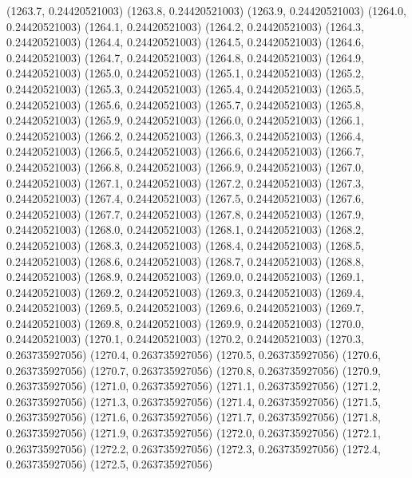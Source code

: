 {					(1263.7, 0.24420521003)
					(1263.8, 0.24420521003)
					(1263.9, 0.24420521003)
					(1264.0, 0.24420521003)
					(1264.1, 0.24420521003)
					(1264.2, 0.24420521003)
					(1264.3, 0.24420521003)
					(1264.4, 0.24420521003)
					(1264.5, 0.24420521003)
					(1264.6, 0.24420521003)
					(1264.7, 0.24420521003)
					(1264.8, 0.24420521003)
					(1264.9, 0.24420521003)
					(1265.0, 0.24420521003)
					(1265.1, 0.24420521003)
					(1265.2, 0.24420521003)
					(1265.3, 0.24420521003)
					(1265.4, 0.24420521003)
					(1265.5, 0.24420521003)
					(1265.6, 0.24420521003)
					(1265.7, 0.24420521003)
					(1265.8, 0.24420521003)
					(1265.9, 0.24420521003)
					(1266.0, 0.24420521003)
					(1266.1, 0.24420521003)
					(1266.2, 0.24420521003)
					(1266.3, 0.24420521003)
					(1266.4, 0.24420521003)
					(1266.5, 0.24420521003)
					(1266.6, 0.24420521003)
					(1266.7, 0.24420521003)
					(1266.8, 0.24420521003)
					(1266.9, 0.24420521003)
					(1267.0, 0.24420521003)
					(1267.1, 0.24420521003)
					(1267.2, 0.24420521003)
					(1267.3, 0.24420521003)
					(1267.4, 0.24420521003)
					(1267.5, 0.24420521003)
					(1267.6, 0.24420521003)
					(1267.7, 0.24420521003)
					(1267.8, 0.24420521003)
					(1267.9, 0.24420521003)
					(1268.0, 0.24420521003)
					(1268.1, 0.24420521003)
					(1268.2, 0.24420521003)
					(1268.3, 0.24420521003)
					(1268.4, 0.24420521003)
					(1268.5, 0.24420521003)
					(1268.6, 0.24420521003)
					(1268.7, 0.24420521003)
					(1268.8, 0.24420521003)
					(1268.9, 0.24420521003)
					(1269.0, 0.24420521003)
					(1269.1, 0.24420521003)
					(1269.2, 0.24420521003)
					(1269.3, 0.24420521003)
					(1269.4, 0.24420521003)
					(1269.5, 0.24420521003)
					(1269.6, 0.24420521003)
					(1269.7, 0.24420521003)
					(1269.8, 0.24420521003)
					(1269.9, 0.24420521003)
					(1270.0, 0.24420521003)
					(1270.1, 0.24420521003)
					(1270.2, 0.24420521003)
					(1270.3, 0.263735927056)
					(1270.4, 0.263735927056)
					(1270.5, 0.263735927056)
					(1270.6, 0.263735927056)
					(1270.7, 0.263735927056)
					(1270.8, 0.263735927056)
					(1270.9, 0.263735927056)
					(1271.0, 0.263735927056)
					(1271.1, 0.263735927056)
					(1271.2, 0.263735927056)
					(1271.3, 0.263735927056)
					(1271.4, 0.263735927056)
					(1271.5, 0.263735927056)
					(1271.6, 0.263735927056)
					(1271.7, 0.263735927056)
					(1271.8, 0.263735927056)
					(1271.9, 0.263735927056)
					(1272.0, 0.263735927056)
					(1272.1, 0.263735927056)
					(1272.2, 0.263735927056)
					(1272.3, 0.263735927056)
					(1272.4, 0.263735927056)
					(1272.5, 0.263735927056)
}
